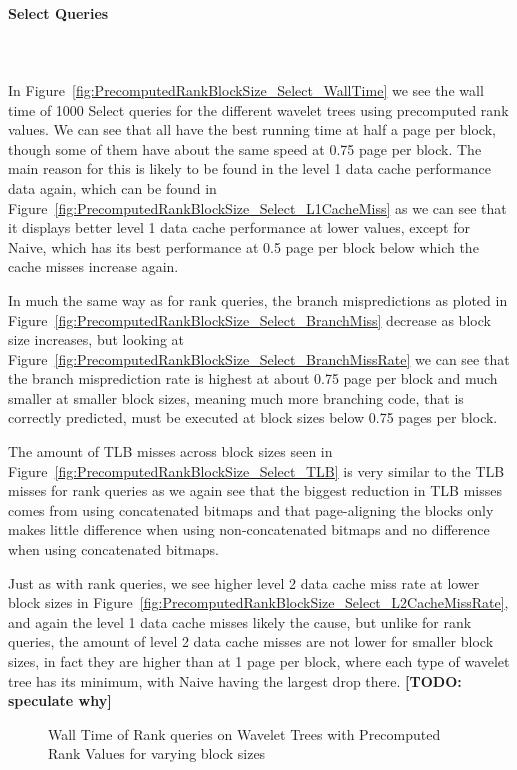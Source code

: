 \paragraph{Select Queries}~\\\\
In Figure~\ref{fig:PrecomputedRankBlockSize_Select_WallTime} we see the wall time of 1000 Select queries for the different wavelet trees using precomputed rank values.
We can see that all have the best running time at half a page per block, though some of them have about the same speed at 0.75 page per block.
The main reason for this is likely to be found in the level 1 data cache performance data again, which can be found in Figure~\ref{fig:PrecomputedRankBlockSize_Select_L1CacheMiss} as we can see that it displays better level 1 data cache performance at lower values, except for Naive, which has its best performance at 0.5 page per block below which the cache misses increase again.

In much the same way as for rank queries, the branch mispredictions as ploted in Figure~\ref{fig:PrecomputedRankBlockSize_Select_BranchMiss} decrease as block size increases, but looking at Figure~\ref{fig:PrecomputedRankBlockSize_Select_BranchMissRate} we can see that the branch misprediction rate is highest at about 0.75 page per block and much smaller at smaller block sizes, meaning much more branching code, that is correctly predicted, must be executed at block sizes below 0.75 pages per block.

The amount of TLB misses across block sizes seen in Figure~\ref{fig:PrecomputedRankBlockSize_Select_TLB} is very similar to the TLB misses for rank queries as we again see that the biggest reduction in TLB misses comes from using concatenated bitmaps and that page-aligning the blocks only makes little difference when using non-concatenated bitmaps and no difference when using concatenated bitmaps.

Just as with rank queries, we see higher level 2 data cache miss rate at lower block sizes in Figure~\ref{fig:PrecomputedRankBlockSize_Select_L2CacheMissRate}, and again the level 1 data cache misses likely the cause, but unlike for rank queries, the amount of level 2 data cache misses are not lower for smaller block sizes, in fact they are higher than at 1 page per block, where each type of wavelet tree has its minimum, with Naive having the largest drop there.
\textbf{[TODO: speculate why]}



\begin{figure}
	
	\caption{Wall Time of Rank queries on Wavelet Trees with Precomputed Rank Values for varying block sizes}
	\label{fig:PrecomputedRankBlockSize_Rank_WallTime}
\end{figure}

